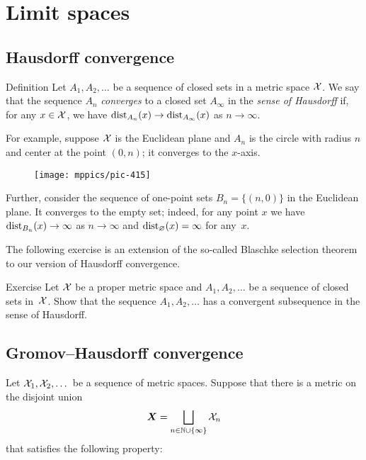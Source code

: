 \chapter{Limit spaces}\label{chap:lim}

\section{Hausdorff convergence}

\begin{thm}{Definition}\label{def:gen-Haus-conv}
Let $A_1,A_2,\dots$ be a sequence of closed sets in a metric space $\mathcal{X}$.
We say that the sequence $A_n$ \emph{converges} to a closed set $A_\infty$ in the {}\emph{sense of Hausdorff} if, for any $x\in\mathcal{X}$, we have
$\distfun_{A_n}(x)\z\to \distfun_{A_\infty}(x)$ as $n\to\infty$.
\end{thm}

For example, suppose $\mathcal{X}$ is the Euclidean plane and $A_n$ is the circle with radius $n$ and center at the point $(0,n)$; it converges to the $x$-axis.

\begin{figure}[ht!]
\vskip-0mm
\centering
\texttt{[image: mppics/pic-415]}
\end{figure}

Further, consider the sequence of one-point sets $B_n=\{(n,0)\}$ in the Euclidean plane.
It converges to the empty set;
indeed, for any point $x$ we have $\mathrm{dist}_{B_n}(x)\to\infty$ as $n\to \infty$ and $\mathrm{dist}_{\varnothing}(x)= \infty$ for any~$x$.

The following exercise is an extension of the so-called Blaschke selection theorem to our version of Hausdorff convergence.

\begin{thm}{Exercise}\label{ex:generalized-selection}
Let $\mathcal{X}$ be a proper metric space
and $A_1,A_2,\dots$ be a sequence of closed sets in~$\mathcal{X}$.
Show that the sequence  $A_1,A_2,\dots$ has a convergent subsequence in the sense of Hausdorff.
\end{thm}

\section{Gromov--Hausdorff convergence}

Let $\mathcal{X}_1,\mathcal{X}_2,\dots$ be a sequence of metric spaces.
Suppose that there is a metric on the disjoint union 
\[\bm{X}=\bigsqcup_{n\in \mathbb{N}\cup\{\infty\}} \mathcal{X}_n\] 
that satisfies the following property:

